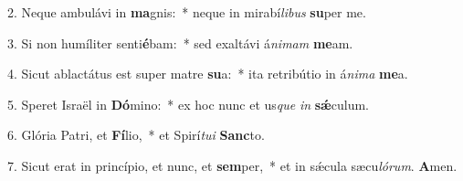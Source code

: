 2. Neque ambulávi in \textbf{ma}gnis:~*  neque in mirabí\textit{li}\textit{bus} \textbf{su}per me.\

3. Si non humíliter senti\textbf{é}bam:~*  sed exaltávi á\textit{ni}\textit{mam} \textbf{me}am.\

4. Sicut ablactátus est super matre \textbf{su}a:~*  ita retribútio in á\textit{ni}\textit{ma} \textbf{me}a.\

5. Speret Israël in \textbf{Dó}mino:~*  ex hoc nunc et us\textit{que} \textit{in} \textbf{sǽ}culum.\

6. Glória Patri, et \textbf{Fí}lio,~*  et Spirí\textit{tu}\textit{i} \textbf{Sanc}to.\

7. Sicut erat in princípio, et nunc, et \textbf{sem}per,~*  et in sǽcula sæcu\textit{ló}\textit{rum}. \textbf{A}men.\

